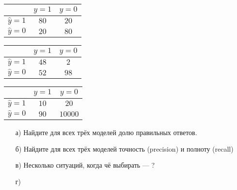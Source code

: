 \documentclass[12pt, a4paper, oneside]{article}
\begin{document}
\begin{minipage}[t]{0.33\textwidth}
\begin{tabular}{|c|c|c|}
\hline
		              & $y=1$  &  $ y = 0$ \\  \hline 
$\hat y = 1$  &   $80$ &    $20$ \\      \hline 
$\hat y = 0$ &   $20$ &     $80$ \\      \hline 
\end{tabular}
\end{minipage}
\begin{minipage}[t]{0.33\textwidth}
\begin{tabular}{|c|c|c|}
	\hline
	& $y=1$  &  $ y = 0$ \\  \hline 
	$\hat y = 1$  &   $48$ &    $2$ \\      \hline 
	$\hat y = 0$ &   $52$ &     $98$ \\      \hline 
\end{tabular}
\end{minipage}
\begin{minipage}[t]{0.33\textwidth}
\begin{tabular}{|c|c|c|}
	\hline
	& $y=1$  &  $ y = 0$ \\  \hline 
	$\hat y = 1$  &   $10$ &    $20$ \\         \hline 
	$\hat y = 0$ &   $90$ &    $10000$ \\   \hline 
\end{tabular}
\end{minipage}





\begin{enumerate}
	\item[а)]  Найдите для всех трёх моделей долю правильных ответов. 
	\item[б)]   Найдите для всех трёх моделей точность (precision) и полноту (recall)
	\item[в)]   Несколько ситуаций, когда чё выбирать --- ? 
	\item[г)]  
\end{enumerate}

\end{document}
